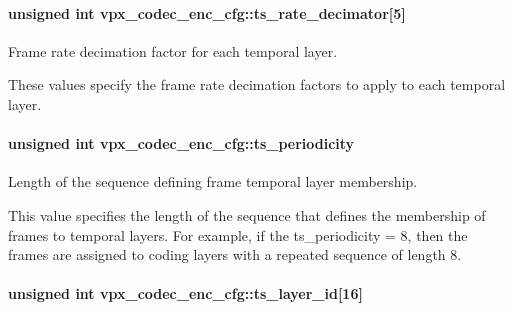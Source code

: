 \paragraph[{\texorpdfstring{ts\+\_\+rate\+\_\+decimator}{ts_rate_decimator}}]{\setlength{\rightskip}{0pt plus 5cm}unsigned int vpx\+\_\+codec\+\_\+enc\+\_\+cfg\+::ts\+\_\+rate\+\_\+decimator\mbox{[}5\mbox{]}}\hypertarget{structvpx__codec__enc__cfg_ad40c30846ef8ef1d8684f10a491ec535}{}\label{structvpx__codec__enc__cfg_ad40c30846ef8ef1d8684f10a491ec535}


Frame rate decimation factor for each temporal layer. 

These values specify the frame rate decimation factors to apply to each temporal layer. 
\paragraph[{\texorpdfstring{ts\+\_\+periodicity}{ts_periodicity}}]{\setlength{\rightskip}{0pt plus 5cm}unsigned int vpx\+\_\+codec\+\_\+enc\+\_\+cfg\+::ts\+\_\+periodicity}\hypertarget{structvpx__codec__enc__cfg_a4ec338780115dd270acf0dac24193474}{}\label{structvpx__codec__enc__cfg_a4ec338780115dd270acf0dac24193474}


Length of the sequence defining frame temporal layer membership. 

This value specifies the length of the sequence that defines the membership of frames to temporal layers. For example, if the ts\+\_\+periodicity = 8, then the frames are assigned to coding layers with a repeated sequence of length 8. 
\paragraph[{\texorpdfstring{ts\+\_\+layer\+\_\+id}{ts_layer_id}}]{\setlength{\rightskip}{0pt plus 5cm}unsigned int vpx\+\_\+codec\+\_\+enc\+\_\+cfg\+::ts\+\_\+layer\+\_\+id\mbox{[}16\mbox{]}}\hypertarget{structvpx__codec__enc__cfg_a4d105d2470dbfb7210b33d298f1cf1f6}{}\label{structvpx__codec__enc__cfg_a4d105d2470dbfb7210b33d298f1cf1f6}


